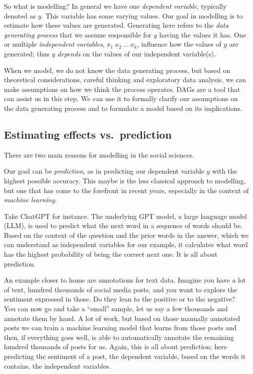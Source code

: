 \documentclass[
]{book}
\begin{document}
So what is modelling? In general we have one \emph{dependent variable}, typically
denoted as \(y\). This variable has some varying values. Our goal in modelling is to estimate how these values are generated. Generating here refers to the
\emph{data generating process} that we assume responsible for \(y\) having the values
it has. One or multiple \emph{independent variables}, \(x_1 \ x_2 \ ... \ x_k\),
influence how the values of \(y\) are generated; thus \(y\) \emph{depends} on the values of our independent variable(s).

When we model, we do not know the data generating process, but based on
theoretical considerations, careful thinking and exploratory data analysis, we
can make assumptions on how we think the process operates. DAGs are a tool that can assist us in this step. We can use it to formally clarify our assumptions on the data generating process and to formulate a model based on its implications.

\hypertarget{estimating-effects-vs.-prediction}{%
\subsection{Estimating effects vs.~prediction}\label{estimating-effects-vs.-prediction}}

There are two main reasons for modelling in the social sciences.

Our goal can be \emph{prediction}, as in predicting our dependent variable \(y\) with
the highest possible accuracy. This maybe is the less classical approach to
modelling, but one that has come to the forefront in recent years, especially in
the context of \emph{machine learning}.

Take ChatGPT for instance. The underlying GPT model, a large language model
(LLM), is used to predict what the next word in a sequence of words should be.
Based on the context of the question and the prior words in the answer, which we
can understand as independent variables for our example, it calculates what word
has the highest probability of being the correct next one. It is all about
prediction.

An example closer to home are annotations for text data. Imagine you have a lot
of text, hundred thousands of social media posts, and you want to explore the
sentiment expressed in those. Do they lean to the positive or to the negative?
You can now go and take a ``small'' sample, let us say a few thousands and
annotate them by hand. A lot of work, but based on those manually annotated
posts we can train a machine learning model that learns from those posts and
then, if everything goes well, is able to automatically annotate the remaining
hundred thousands of posts for us. Again, this is all about prediction; here
predicting the sentiment of a post, the dependent variable, based on the words
it contains, the independent variables.
\end{document}
